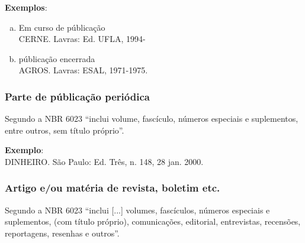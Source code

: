 \begin{exemplomanual}
\textbf{Exemplos}:\\
\begin{enumerate}[a)]
  \item  Em curso de públicação\\
CERNE. Lavras: Ed. UFLA, 1994-
  \item  públicação encerrada\\
AGROS. Lavras: ESAL, 1971-1975.
\end{enumerate}
\end{exemplomanual}


\subsubsection{Parte de públicação periódica}

Segundo a NBR 6023 \cite{NBR6023:2002} ``inclui volume, fascículo, números especiais e suplementos, entre outros, sem título próprio''.

\begin{flushleft}
\begin{singlespace}
\end{singlespace}
\end{flushleft}

\begin{exemplomanual}
\textbf{Exemplo}:\\
DINHEIRO. São Paulo: Ed. Três, n. 148, 28 jan. 2000.
\end{exemplomanual}


\subsubsection{Artigo e/ou matéria de revista, boletim etc.}

Segundo a NBR 6023 \cite[p.6]{NBR6023:2002}``inclui [...] volumes, fascículos, números especiais e suplementos, (com título próprio), comunicações, editorial, entrevistas, recensões, reportagens, resenhas e outros''.

\begin{flushleft}
\begin{singlespace}
\end{singlespace}
\end{flushleft}

